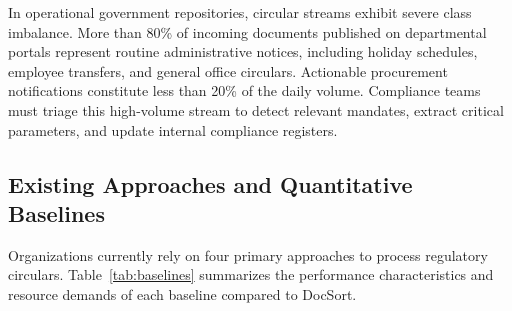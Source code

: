 \documentclass{article}
\begin{document}
In operational government repositories, circular streams exhibit severe class imbalance. More than 80\% of incoming documents published on departmental portals represent routine administrative notices, including holiday schedules, employee transfers, and general office circulars. Actionable procurement notifications constitute less than 20\% of the daily volume. Compliance teams must triage this high-volume stream to detect relevant mandates, extract critical parameters, and update internal compliance registers.

\subsection{Existing Approaches and Quantitative Baselines}
Organizations currently rely on four primary approaches to process regulatory circulars. Table~\ref{tab:baselines} summarizes the performance characteristics and resource demands of each baseline compared to DocSort.

\begin{table}[t]
\centering
{}
\caption{Quantitative comparison of existing baselines versus the proposed DocSort pipeline.}
\label{tab:baselines}
\end{table}
\end{document}
